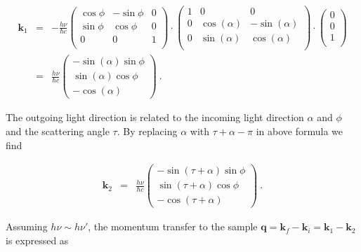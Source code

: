 \documentclass[twocolumn,prb,twocolumn,amsmath,superscriptaddress,nofootinbib,amssymb]{revtex4-1}
\newcommand{\vect}[1]{\boldsymbol{#1}}
\begin{document}
\begin{widetext}
\begin{eqnarray}
\vect{k}_1&=&-\frac{h\nu}{\hbar c}\left(
                  \begin{array}{ccc}
                    \cos\phi & -\sin\phi & 0 \\
                    \sin\phi &\cos\phi &  0 \\
                     0 &0 & 1 \\
                  \end{array}
                \right)\cdot
                \left(
                  \begin{array}{ccc}
                    1 & 0 & 0 \\
                    0 &\cos(\alpha) &  -\sin(\alpha) \\
                     0 &\sin(\alpha) & \cos(\alpha) \\
                  \end{array}
                \right)\cdot\left(
                         \begin{array}{c}
                           0 \\
                           0 \\
                           1 \\
                         \end{array}
                       \right)\nonumber\\&=&\frac{h\nu}{\hbar c}
                       \left(\begin{array}{c} -\sin(\alpha)\sin\phi\\ \sin(\alpha)\cos\phi\\-\cos(\alpha) \end{array}\right)~.
\end{eqnarray}

The outgoing light direction is related to the incoming light direction $\alpha$ and $\phi$ and the scattering angle $\tau$. By replacing $\alpha$ with $\tau+\alpha-\pi$ in above formula we find

\begin{eqnarray}
\vect{k}_2&=&\frac{h\nu}{\hbar c}
                       \left(\begin{array}{c} -\sin(\tau+\alpha)\sin\phi\\ \sin(\tau+\alpha)\cos\phi\\-\cos(\tau+\alpha) \end{array}\right)~.
\end{eqnarray}

Assuming $h\nu\sim h\nu'$, the momentum transfer to the sample $\vect{q}=\vect{k}_f-\vect{k}_i=\vect{k}_1-\vect{k}_2$ is expressed as


\end{widetext}
\end{document}
